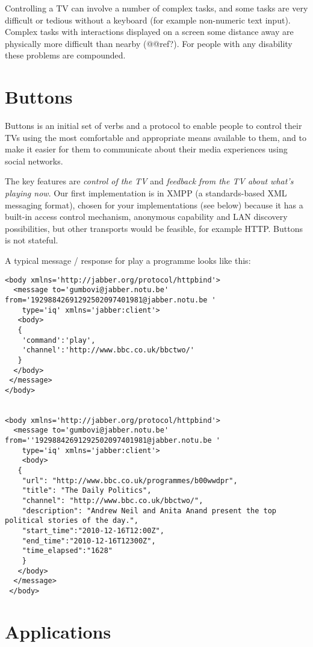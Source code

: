 \documentclass[]{article}%
\begin{document}
Controlling a TV can involve a number of complex tasks, and some tasks are very difficult or tedious without a keyboard (for example non-numeric text input). Complex tasks with interactions displayed on a screen some distance away are physically more difficult than nearby (@@ref?).  For people with any disability these problems are compounded.


\section{Buttons} 

Buttons is an initial set of verbs and a protocol to enable people to control their TVs using the most comfortable and appropriate means available to them, and to make it easier for them to communicate about their media experiences using social networks.

The key features are \emph{control of the TV} and \emph{feedback from the TV about what's playing now}. Our first implementation is in XMPP (a standards-based XML messaging format), chosen for your implementations (see below) because it has a built-in access control mechanism, anonymous capability and LAN discovery possibilities, but other transports would be feasible, for example HTTP. Buttons is not stateful.

A typical message / response for play a programme looks like this:

\begin{verbatim}
<body xmlns='http://jabber.org/protocol/httpbind'>
  <message to='gumbovi@jabber.notu.be' from='19298842691292502097401981@jabber.notu.be ' 
    type='iq' xmlns='jabber:client'>
   <body>
   {
    'command':'play',
    'channel':'http://www.bbc.co.uk/bbctwo/'
   }
  </body>
 </message>
</body>


<body xmlns='http://jabber.org/protocol/httpbind'>
  <message to='gumbovi@jabber.notu.be' from=''19298842691292502097401981@jabber.notu.be ' 
    type='iq' xmlns='jabber:client'>
    <body> 
   {
    "url": "http://www.bbc.co.uk/programmes/b00wwdpr",
    "title": "The Daily Politics",
    "channel": "http://www.bbc.co.uk/bbctwo/",
    "description": "Andrew Neil and Anita Anand present the top political stories of the day.",
    "start_time":"2010-12-16T12:00Z",
    "end_time":"2010-12-16T12300Z",
    "time_elapsed":"1628"
    }
   </body>
  </message>
 </body>
\end{verbatim}

\section{Applications}
\end{document}
